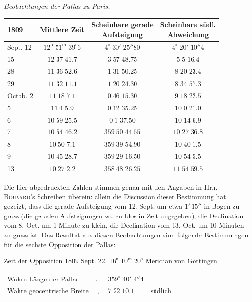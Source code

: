 \begin{center}\emph{Beobachtungen der Pallas zu Paris.}\end{center}
\begin{center}\fontsize{9}{11}\selectfont\setlength{\tabcolsep}{5pt}\renewcommand{\arraystretch}{1.15}\begin{tabular}{l|c|c|c}
1809 & Mittlere Zeit & \shortstack{Scheinbare gerade\\Aufsteigung} & \shortstack{Scheinbare südl.\\Abweichung}\\\hline
Sept. 12 & $12^{\text{u}}\;51^{\text{m}}\;39^{\text{s}}6$ & $4^\circ\;30'\;25''80$ & $4^\circ\;20'\;10''4$\\
15 & $12\;37\;41.7$ & $3\;57\;48.75$ & $5\;5\;16.4$\\
28 & $11\;36\;52.6$ & $1\;31\;50.25$ & $8\;20\;23.4$\\
29 & $11\;32\;11.1$ & $1\;20\;24.30$ & $8\;34\;57.3$\\
Octob. 2 & $11\;18\;7.1$ & $0\;46\;15.30$ & $9\;18\;22.5$\\
5 & $11\;4\;5.9$ & $0\;12\;35.25$ & $10\;0\;21.0$\\
6 & $10\;59\;25.5$ & $0\;1\;37.50$ & $10\;14\;6.9$\\
7 & $10\;54\;46.2$ & $359\;50\;44.55$ & $10\;27\;36.8$\\
8 & $10\;50\;7.1$ & $359\;39\;54.90$ & $10\;40\;1.5$\\
9 & $10\;45\;28.7$ & $359\;29\;16.50$ & $10\;54\;5.5$\\
13 & $10\;27\;2.2$ & $358\;48\;26.25$ & $11\;54\;59.5$\\
\end{tabular}\end{center}

\par\indent Die hier abgedruckten Zahlen stimmen genau mit den Angaben in Hrn. \textsc{Bouvard}'s Schreiben überein: allein die Discussion dieser Bestimmung hat gezeigt, dass die gerade Aufsteigung vom 12. Sept. um etwa $1'\,15''$ in Bogen zu gross (die geraden Aufsteigungen waren blos in Zeit angegeben); die Declination vom 8. Oct. um 1 Minute zu klein, die Declination vom 13. Oct. um 10 Minuten zu gross ist. Das Resultat aus diesen Beobachtungen sind folgende Bestimmungen für die sechste Opposition der Pallas:

\begin{center}
Zeit der Opposition 1809 Sept. 22. $16^{\text{u}}\;10^{\text{m}}\;20^{\text{s}}$ Meridian von Göttingen\par
\begin{tabular}{@{}lcll@{}}
Wahre Länge der Pallas & $.\;.$ & $359^\circ\;40'\;4''4$ & \\
Wahre geocentrische Breite & , & $7\;22\;10.1$ & südlich
\end{tabular}
\end{center}

